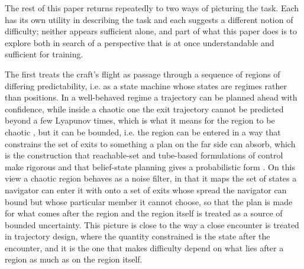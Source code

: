 \documentclass[11pt]{article}
\begin{document}
The rest of this paper returns repeatedly to two ways of picturing the
task. Each has its own utility in describing the task and each suggests a
different notion of difficulty; neither appears sufficient alone, and part of
what this paper does is to explore both in search of a perspective that is
at once understandable and sufficient for training.

The first treats the craft's flight as passage through a sequence of regions
of differing predictability, i.e. as a state machine whose states are
regimes rather than positions. In a well-behaved regime a trajectory can be
planned ahead with confidence, while inside a chaotic one the exit
trajectory cannot be predicted beyond a few Lyapunov times, which is what it
means for the region to be chaotic \cite{lorenz1963,grebogi1983}, but it can
be bounded, i.e. the region can be entered in a way that
constrains the set of exits to something a plan on the far side can absorb,
which is the construction that reachable-set and tube-based formulations of
control make rigorous \cite{mitchell2005,mayne2005} and that belief-state
planning gives a probabilistic form \cite{kaelbling1998}. On this view a
chaotic region behaves as a noise filter, in that it maps the set of states
a navigator can enter it with onto a set of exits whose spread the navigator
can bound but whose particular member it cannot choose, so that the plan is
made for what comes after the region and the region itself is treated as a
source of bounded uncertainty. This picture is close to the way a close
encounter is treated in trajectory design, where the quantity constrained is
the state after the encounter, and it is the one that makes difficulty depend
on what lies after a region as much as on the region itself.
\end{document}
